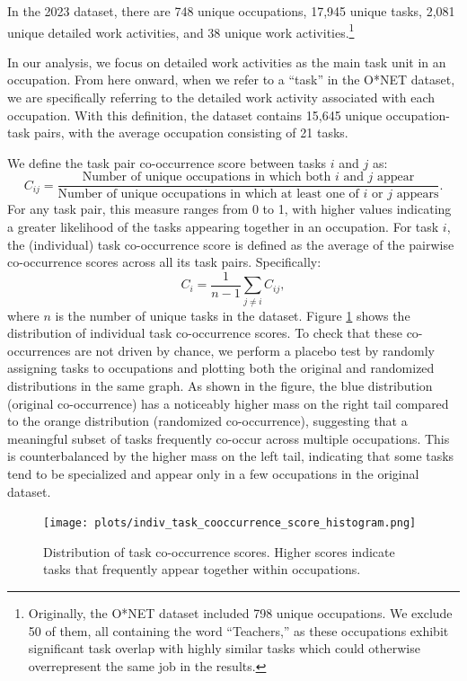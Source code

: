 \documentclass{article}
\theoremstyle{plain}
\theoremstyle{plain}
\begin{document}
In the 2023 dataset, there are 748 unique occupations, 17,945 unique tasks, 2,081 unique detailed work activities, and 38 unique work activities.\footnote{Originally, the O*NET dataset included 798 unique occupations. We exclude 50 of them, all containing the word ``Teachers,'' as these occupations exhibit significant task overlap with highly similar tasks which could otherwise overrepresent the same job in the results.}

In our analysis, we focus on detailed work activities as the main task unit in an occupation. 
From here onward, when we refer to a “task” in the O*NET dataset, we are specifically referring to the detailed work activity associated with each occupation. 
With this definition, the dataset contains 15,645 unique occupation-task pairs, with the average occupation consisting of 21 tasks.

We define the task pair co-occurrence score between tasks $i$ and $j$  as:
$$C_{ij} = \frac{\text{Number of unique occupations in which both $i$ and $j$ appear}}{\text{Number of unique occupations in which at least one of $i$ or $j$ appears}}.$$
For any task pair, this measure ranges from 0 to 1, with higher values indicating a greater likelihood of the tasks appearing together in an occupation.
For task $i$, the (individual) task co-occurrence score is defined as the average of the pairwise co-occurrence scores across all its task pairs. Specifically:
$$C_{i}=\frac{1}{n-1}\sum_{j\neq i}C_{ij},$$ 
where $n$ is the number of unique tasks in the dataset.
Figure \ref{fig:task_cooc} shows the distribution of individual task co-occurrence scores. 
To check that these co-occurrences are not driven by chance, we perform a placebo test by randomly assigning tasks to occupations and plotting both the original and randomized distributions in the same graph. 
As shown in the figure, the blue distribution (original co-occurrence) has a noticeably higher mass on the right tail compared to the orange distribution (randomized co-occurrence), suggesting that a meaningful subset of tasks frequently co-occur across multiple occupations. 
This is counterbalanced by the higher mass on the left tail, indicating that some tasks tend to be specialized and appear only in a few occupations in the original dataset.

\begin{figure}[htbp]
  \centering
  \texttt{[image: plots/indiv\_task\_cooccurrence\_score\_histogram.png]}
  \caption{Distribution of task co-occurrence scores. Higher scores indicate tasks that frequently appear together within occupations.}
  \label{fig:task_cooc}
\end{figure}
\end{document}
